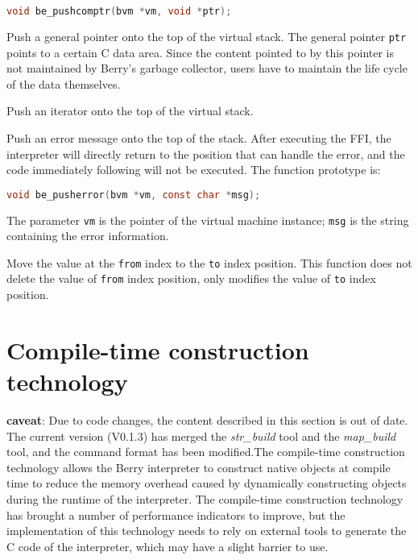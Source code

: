 
\begin{lstlisting}[language=c, style=berry, numbers=none]
void be_pushcomptr(bvm *vm, void *ptr);
\end{lstlisting}

Push a general pointer onto the top of the virtual stack. The general pointer \texttt{ptr} points to a certain C data area. Since the content pointed to by this pointer is not maintained by Berry's garbage collector, users have to maintain the life cycle of the data themselves.


Push an iterator onto the top of the virtual stack.


Push an error message onto the top of the stack. After executing the FFI, the interpreter will directly return to the position that can handle the error, and the code immediately following will not be executed. The function prototype is:
\begin{lstlisting}[language=c, style=berry, numbers=none]
void be_pusherror(bvm *vm, const char *msg);
\end{lstlisting}
The parameter \texttt{vm} is the pointer of the virtual machine instance; \texttt{msg} is the string containing the error information.


Move the value at the \texttt{from} index to the \texttt{to} index position. This function does not delete the value of \texttt{from} index position, only modifies the value of \texttt{to} index position.


\section{Compile-time construction technology} \label{section::precompiled_build}

\textbf{caveat}: Due to code changes, the content described in this section is out of date. The current version (V0.1.3) has merged the \textsl{str\_build} tool and the \textsl{map\_build} tool, and the command format has been modified.The compile-time construction technology allows the Berry interpreter to construct native objects at compile time to reduce the memory overhead caused by dynamically constructing objects during the runtime of the interpreter. The compile-time construction technology has brought a number of performance indicators to improve, but the implementation of this technology needs to rely on external tools to generate the C code of the interpreter, which may have a slight barrier to use.

